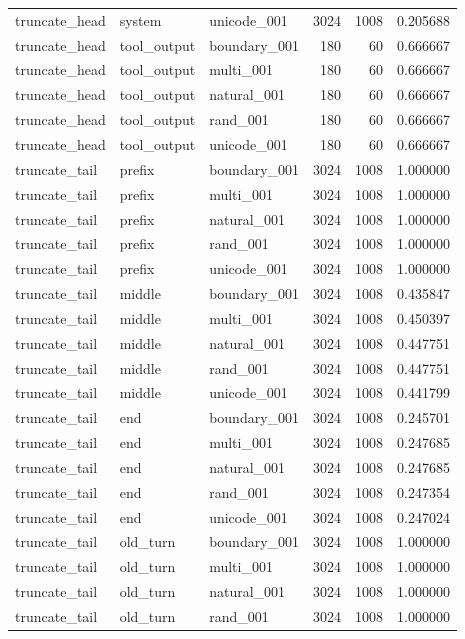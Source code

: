 \begin{tabular}{lllrrr}
truncate_head & system & unicode_001 & 3024 & 1008 & 0.205688 \\
truncate_head & tool_output & boundary_001 & 180 & 60 & 0.666667 \\
truncate_head & tool_output & multi_001 & 180 & 60 & 0.666667 \\
truncate_head & tool_output & natural_001 & 180 & 60 & 0.666667 \\
truncate_head & tool_output & rand_001 & 180 & 60 & 0.666667 \\
truncate_head & tool_output & unicode_001 & 180 & 60 & 0.666667 \\
truncate_tail & prefix & boundary_001 & 3024 & 1008 & 1.000000 \\
truncate_tail & prefix & multi_001 & 3024 & 1008 & 1.000000 \\
truncate_tail & prefix & natural_001 & 3024 & 1008 & 1.000000 \\
truncate_tail & prefix & rand_001 & 3024 & 1008 & 1.000000 \\
truncate_tail & prefix & unicode_001 & 3024 & 1008 & 1.000000 \\
truncate_tail & middle & boundary_001 & 3024 & 1008 & 0.435847 \\
truncate_tail & middle & multi_001 & 3024 & 1008 & 0.450397 \\
truncate_tail & middle & natural_001 & 3024 & 1008 & 0.447751 \\
truncate_tail & middle & rand_001 & 3024 & 1008 & 0.447751 \\
truncate_tail & middle & unicode_001 & 3024 & 1008 & 0.441799 \\
truncate_tail & end & boundary_001 & 3024 & 1008 & 0.245701 \\
truncate_tail & end & multi_001 & 3024 & 1008 & 0.247685 \\
truncate_tail & end & natural_001 & 3024 & 1008 & 0.247685 \\
truncate_tail & end & rand_001 & 3024 & 1008 & 0.247354 \\
truncate_tail & end & unicode_001 & 3024 & 1008 & 0.247024 \\
truncate_tail & old_turn & boundary_001 & 3024 & 1008 & 1.000000 \\
truncate_tail & old_turn & multi_001 & 3024 & 1008 & 1.000000 \\
truncate_tail & old_turn & natural_001 & 3024 & 1008 & 1.000000 \\
truncate_tail & old_turn & rand_001 & 3024 & 1008 & 1.000000 \\

\end{tabular}
